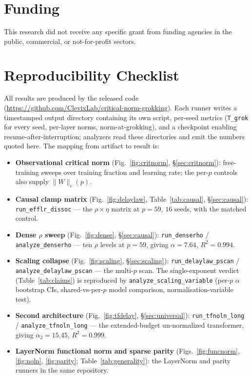 \documentclass[10pt,twocolumn]{article}
\newcommand{\Wc}{\|W\|_{c}}
\begin{document}
\section*{Funding}
This research did not receive any specific grant from funding agencies in the public, commercial, or
not-for-profit sectors.

\appendix
\section{Reproducibility Checklist}
\label{app:repro}
All results are produced by the released code (\url{https://github.com/ClevixLab/critical-norm-grokking}).
Each runner writes a timestamped output directory containing its own script, per-seed metrics
(\texttt{T\_grok} for every seed, per-layer norms, norm-at-grokking), and a checkpoint enabling
resume-after-interruption; analyzers read these directories and emit the numbers quoted here. The mapping
from artifact to result is:

\begin{itemize}[noitemsep]
\item \textbf{Observational critical norm} (Fig.~\ref{fig:critnorm}, \S\ref{sec:critnorm}): free-training
sweeps over training fraction and learning rate; the per-$p$ controls also supply $\Wc(p)$.
\item \textbf{Causal clamp matrix} (Fig.~\ref{fig:delaylaw}, Table~\ref{tab:causal}, \S\ref{sec:causal}):
\texttt{run\_efflr\_dissoc} --- the $\rho\times\eta$ matrix at $p=59$, $16$ seeds, with the matched control.
\item \textbf{Dense $\rho$ sweep} (Fig.~\ref{fig:dense}, \S\ref{sec:causal}): \texttt{run\_denserho} /
\texttt{analyze\_denserho} --- ten $\rho$ levels at $p=59$, giving $\alpha=7.64$, $R^2=0.994$.
\item \textbf{Scaling collapse} (Fig.~\ref{fig:scaling}, \S\ref{sec:scaling}): \texttt{run\_delaylaw\_pscan}
/ \texttt{analyze\_delaylaw\_pscan} --- the multi-$p$ scan. The single-exponent verdict
(Table~\ref{tab:claims}) is reproduced by \texttt{analyze\_scaling\_variable} (per-$p$ $\alpha$ bootstrap
CIs, shared-vs-per-$p$ model comparison, normalisation-variable test).
\item \textbf{Second architecture} (Fig.~\ref{fig:tfdelay}, \S\ref{sec:universal}):
\texttt{run\_tfnoln\_long} / \texttt{analyze\_tfnoln\_long} --- the extended-budget un-normalized
transformer, giving $\alpha_2=15.45$, $R^2=0.999$.
\item \textbf{LayerNorm functional norm and sparse parity} (Figs.~\ref{fig:funcnorm}, \ref{fig:noln},
\ref{fig:parity}; Table~\ref{tab:generality}): the LayerNorm and parity runners in the same repository.
\end{itemize}
\end{document}
